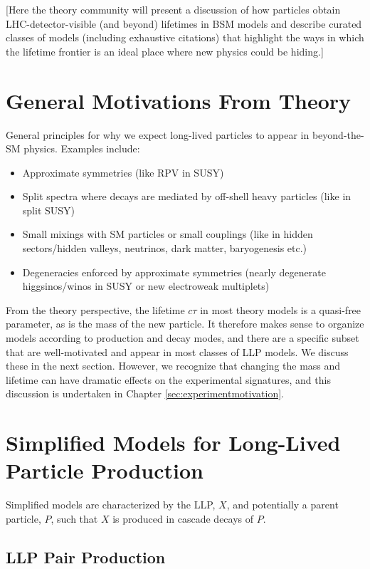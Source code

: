 [Here the theory community will present a discussion of how particles obtain LHC-detector-visible (and beyond) lifetimes in BSM models and describe curated classes of models (including exhaustive citations) that highlight the ways in which the lifetime frontier is an ideal place where new physics could be hiding.]

\section{General Motivations From Theory}

General principles for why we expect long-lived particles to appear in beyond-the-SM physics. Examples include:
%
\begin{itemize}

\item Approximate symmetries (like RPV in SUSY)
\item Split spectra where decays are mediated by off-shell heavy particles (like in split SUSY)
\item Small mixings with SM particles or small couplings (like in hidden sectors/hidden valleys, neutrinos, dark matter, baryogenesis etc.)
\item Degeneracies enforced by approximate symmetries (nearly degenerate higgsinos/winos in SUSY or new electroweak multiplets)

\end{itemize}

From the theory perspective, the lifetime $c\tau$ in most theory models is a quasi-free parameter, as is the mass of the new particle. It therefore makes sense to organize models according to production and decay modes, and there are a specific subset that are well-motivated and appear in most classes of LLP models. We discuss these in the next section. However, we recognize that changing the mass and lifetime can have dramatic effects on the experimental signatures, and this discussion is undertaken in Chapter \ref{sec:experimentmotivation}.

\section{Simplified Models for Long-Lived Particle Production}

Simplified models are characterized by the LLP, $X$, and potentially a parent particle, $P$, such that $X$ is produced in cascade decays of $P$. 

\subsection{LLP Pair Production}

